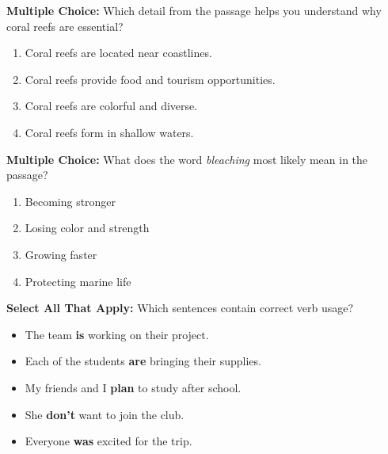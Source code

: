\documentclass[12pt]{article}
\begin{document}
\begin{tcolorbox}[colframe=black!50, colback=white, title=Question 3]
\textbf{Multiple Choice:} Which detail from the passage helps you understand why coral reefs are essential?  
\begin{enumerate}[label=(\Alph*)]
\item Coral reefs are located near coastlines.  
\item Coral reefs provide food and tourism opportunities.  
\item Coral reefs are colorful and diverse.  
\item Coral reefs form in shallow waters.  
\end{enumerate}
\end{tcolorbox}

\begin{tcolorbox}[colframe=black!50, colback=white, title=Question 4]
\textbf{Multiple Choice:} What does the word \textit{bleaching} most likely mean in the passage?  
\begin{enumerate}[label=(\Alph*)]
\item Becoming stronger  
\item Losing color and strength  
\item Growing faster  
\item Protecting marine life  
\end{enumerate}
\end{tcolorbox}

\begin{tcolorbox}[colframe=black!50, colback=white, title=Question 5]
\textbf{Select All That Apply:} Which sentences contain correct verb usage?  
\begin{itemize}
\item The team \textbf{is} working on their project.  
\item Each of the students \textbf{are} bringing their supplies.  
\item My friends and I \textbf{plan} to study after school.  
\item She \textbf{don’t} want to join the club.  
\item Everyone \textbf{was} excited for the trip.  
\end{itemize}
\end{tcolorbox}
\end{document}
